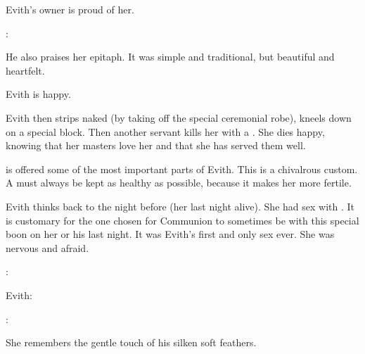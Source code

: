 Evith's owner is proud of her. 

\begin{prose}
  \Teshrial:
\end{prose}

He also praises her epitaph. 
It was simple and traditional, but beautiful and heartfelt. 

Evith is happy. 

Evith then strips naked (by taking off the special ceremonial robe), kneels down on a special block. 
Then another servant kills her with a . 
She dies happy, knowing that her masters love her and that she has served them well. 

\Firaxel{} is offered some of the most important parts of Evith. 
This is a chivalrous custom. 
A \resvil{} must always be kept as healthy as possible, because it makes her more fertile. 

Evith thinks back to the night before (her last night alive). 
She had sex with \Teshrial. 
It is customary for the one chosen for Communion to sometimes be \honoured with this special boon on her or his last night. 
It was Evith's first and only sex ever. 
She was nervous and afraid. 

\begin{prose}
  \Teshrial: 
  
  Evith: 
  
  \Teshrial: 
\end{prose}

She remembers the gentle touch of his silken soft feathers. 





